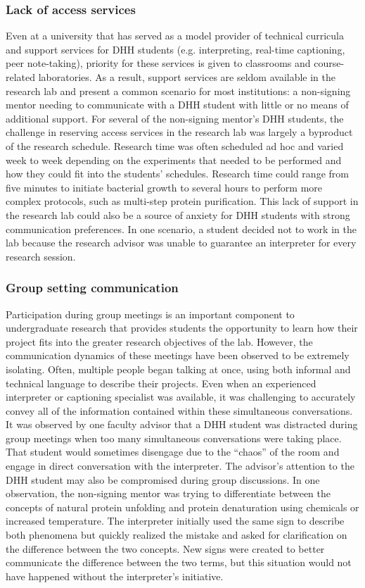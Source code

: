 \documentclass[11.5pt]{sig-alternate} %
\begin{document}
\begin{large}
\subsubsection*{Lack of access services}
Even at a university that has served as a model provider of technical curricula and support services for DHH students (e.g. interpreting, real-time captioning, peer note-taking), priority for these services is given to classrooms and course-related laboratories. As a result, support services are seldom available in the research lab and present a common scenario for most institutions: a non-signing mentor needing to communicate with a DHH student with little or no means of additional support. For several of the non-signing mentor’s DHH students, the challenge in reserving access services in the research lab was largely a byproduct of the research schedule. Research time was often scheduled ad hoc and varied week to week depending on the experiments that needed to be performed and how they could fit into the students’ schedules. Research time could range from five minutes to initiate bacterial growth to several hours to perform more complex protocols, such as multi-step protein purification. This lack of support in the research lab could also be a source of anxiety for DHH students with strong communication preferences. In one scenario, a student decided not to work in the lab because the research advisor was unable to guarantee an interpreter for every research session. 

\subsubsection*{Group setting communication} Participation during group meetings is an important component to undergraduate research that provides students the opportunity to learn how their project fits into the greater research objectives of the lab. However, the communication dynamics of these meetings have been observed to be extremely isolating. Often, multiple people began talking at once, using both informal and technical language to describe their projects. Even when an experienced interpreter or captioning specialist was available, it was challenging to accurately convey all of the information contained within these simultaneous conversations. It was observed by one faculty advisor that a DHH student was distracted during group meetings when too many simultaneous conversations were taking place. That student would sometimes disengage due to the “chaos” of the room and engage in direct conversation with the interpreter. The advisor’s attention to the DHH student may also be compromised during group discussions. In one observation, the non-signing mentor was trying to differentiate between the concepts of natural protein unfolding and protein denaturation using chemicals or increased temperature. The interpreter initially used the same sign to describe both phenomena but quickly realized the mistake and asked for clarification on the difference between the two concepts. New signs were created to better communicate the difference between the two terms, but this situation would not have happened without the interpreter’s initiative. 


\end{large}
\end{document}
